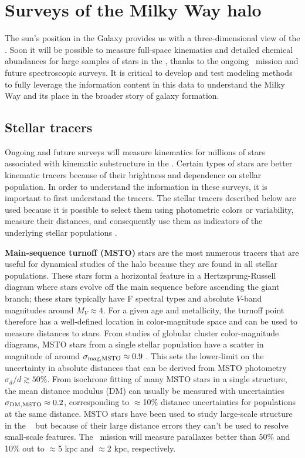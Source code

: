 \section{Surveys of the Milky Way halo} \label{sec:mw-surveys}

The sun's position in the Galaxy provides us with a three-dimensional view of
the \mwhalo. Soon it will be possible to measure full-space kinematics and
detailed chemical abundances for large samples of stars in the \mwhalo, thanks
to the ongoing \gaia\ mission and future spectroscopic surveys. It is critical
to develop and test modeling methods to fully leverage the information content
in this data to understand the Milky Way and its place in the broader story of
galaxy formation.

\subsection{Stellar tracers}

Ongoing and future surveys will measure kinematics for millions of stars
associated with kinematic substructure in the \mwhalo. Certain types of stars
are better kinematic tracers because of their brightness and dependence on
stellar population. In order to understand the information in these surveys, it
is important to first understand the tracers. The stellar tracers described
below are used because it is possible to select them using photometric colors or
variability, measure their distances, and consequently use them as indicators of
the underlying stellar populations \citep[e.g.,][]{bell10, apw15-triand}.

{\bf Main-sequence turnoff (MSTO)} stars are the most numerous tracers that are
useful for dynamical studies of the halo because they are found in all stellar
populations. These stars form a horizontal feature in a Hertzsprung-Russell
diagram where stars evolve off the main sequence before ascending the giant
branch; these stars typically have F spectral types and absolute $V$-band
magnitudes around $M_V \approx 4$. For a given age and metallicity, the turnoff
point therefore has a well-defined location in color-magnitude space and can be
used to measure distances to stars. From studies of globular cluster
color-magnitude diagrams, MSTO stars from a single stellar population have a
scatter in magnitude of around $\sigma_{\rm mag,MSTO} \approx 0.9$
\citep{bell08, bell10}. This sets the lower-limit on the uncertainty in absolute
distances that can be derived from MSTO photometry $\sigma_{d}/d \gtrsim 50\%$.
From isochrone fitting of many MSTO stars in a single structure, the mean
distance modulus (DM) can usually be measured with uncertainties $\sigma_{\rm
DM,MSTO} \approx 0.2$, corresponding to $\approx$10\% distance uncertainties for
populations at the same distance. MSTO stars have been used to study large-scale
structure in the \mwhalo\ \citep[e.g.,][]{newberg02} but because of their large
distance errors they can't be used to resolve small-scale features. The \gaia\
mission will measure parallaxes better than 50\% and 10\% out to $\approx$5 kpc
and $\approx$2 kpc, respectively.

